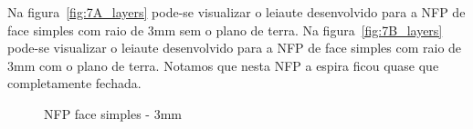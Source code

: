 Na figura~\ref{fig:7A_layers} pode-se visualizar o leiaute desenvolvido para a NFP de face simples com raio de 3mm sem o plano de terra. Na figura~\ref{fig:7B_layers} pode-se visualizar o leiaute desenvolvido para a NFP de face simples com raio de 3mm com o plano de terra. Notamos que nesta NFP a espira ficou quase que completamente fechada.
\begin{figure}[htb!]
	\centering
 	\caption{NFP face simples - 3mm}
\end{figure}

